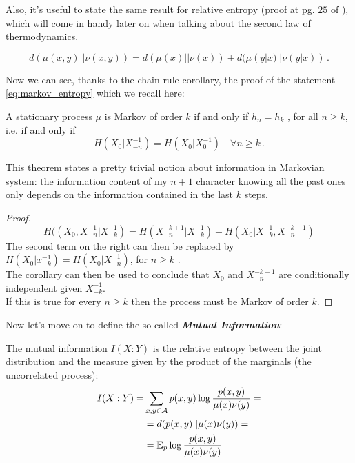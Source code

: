 Also, it's useful to state the same result for relative entropy (proof at pg. $25$ of \cite{Cover_and_Thomas}), which will come in handy later on when talking about the second law of thermodynamics.
\begin{theorem}
\label{th:chain_rule_crossentropy}
        \begin{equation*}
            d(\mu(x,y) || \nu(x,y)) = d(\mu(x) || \nu(x)) + d(\mu(y|x) || \nu(y|x)) \, .
        \end{equation*}
\end{theorem}
Now we can see, thanks to the chain rule corollary, the proof of the statement \ref{eq:markov_entropy} which we recall here:
\begin{theorem}
    A stationary process $\mu$ is Markov of order $k$ if and only if $h_n = h_k$ , for all $n \geq k$, i.e. if and only if 
    \begin{equation}
        H(X_0 | X_{-n}^{-1}) = H(X_0 | X_{0}^{-1}) \quad \forall n \geq k \, .
    \end{equation}
\end{theorem}
This theorem states a pretty trivial notion about information in Markovian system: the information content of my $n+1$ character knowing all the past ones only depends on the information contained in the last $k$ steps.
\begin{proof} 
    \begin{equation*}
        H( (X_0, X_{-n}^{-1} | X_{-k}^{-1} ) = H( X_{-n}^{-k+1} | X_{-k}^{-1} ) + H( X_0 | X_{-k}^{-1}, X_{-n}^{-k+1} )
    \end{equation*}
    The second term on the right can then be replaced by $H(X_0 | x_{-k}^{-1}) = H(X_0 | X_{-n}^{-1})$, for $n \geq k$ .
    \\The corollary can then be used to conclude that $X_0$ and $X_{-n}^{-k+1}$ are conditionally independent given $X_{-k}^{-1}$. 
    \\If this is true for every $n \geq k$ then the process must be Markov of order $k$.
\end{proof}
Now let's move on to define the so called \textbf{\textit{Mutual Information}}:
\begin{definition}
    The mutual information $I(X : Y)$ is the relative entropy between the joint distribution and the measure given by the product of the marginals (the uncorrelated process):
    \begin{align}
        I(X : Y) = &  \sum_{x,y \in \mathcal{A}} p(x,y) \log \frac{p(x,y)}{\mu(x) \nu(y)} = \\ &= d( p(x,y) || \mu(x) \nu(y)) = \\ &= \mathbb{E}_p \log \frac{p(x,y)}{\mu(x) \nu(y)} 
    \end{align}
\end{definition}
